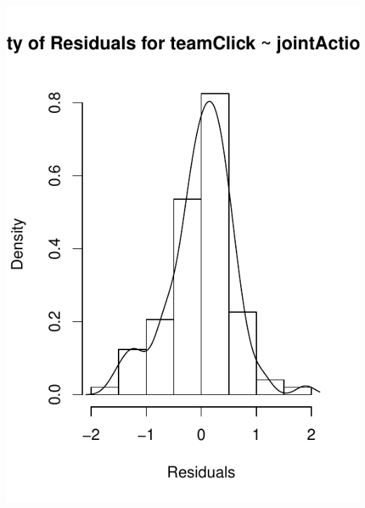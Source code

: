 \documentclass[12pt]{report}
\begin{document}
\includegraphics{../images/MLM1aHistResiduals.pdf}
\end{document}
